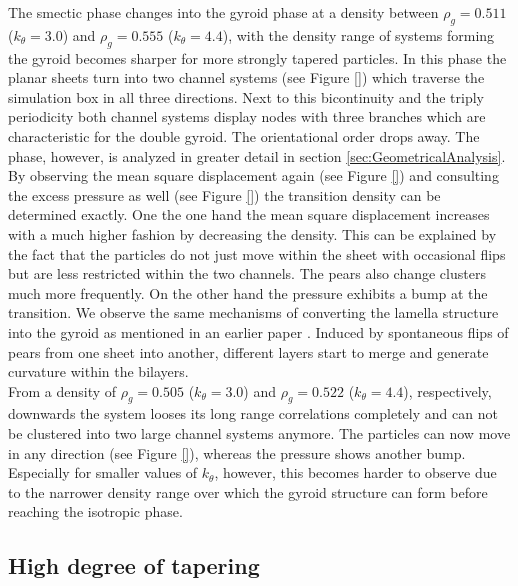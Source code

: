 \documentclass[epj,onecolumn]{webofc}
\begin{document}
The smectic phase changes into the gyroid phase at a density between $\rho_g=0.511$ ($k_{\theta}=3.0$) and $\rho_g=0.555$ ($k_{\theta}=4.4$), with the density range of systems forming the gyroid becomes sharper for more 
strongly tapered particles. In this phase the planar sheets turn into two channel systems (see Figure \ref{}) which traverse the simulation box in all three directions. Next to this bicontinuity and the triply periodicity both channel 
systems display nodes with three branches which are characteristic for the double gyroid. The orientational order drops away. The phase, however, is analyzed in greater detail in section \ref{sec:GeometricalAnalysis}. By 
observing the mean square displacement again (see Figure \ref{}) and consulting the excess pressure as well (see Figure \ref{}) the transition density can be determined exactly. One the one hand the mean square displacement 
increases with a much higher fashion by decreasing the density. This can be explained by the fact that the particles do not just move within the sheet with occasional flips but are less restricted within the two channels. The pears 
also change clusters much more frequently. On the other hand the pressure exhibits a bump at the transition. We observe the same mechanisms of converting the lamella structure into the gyroid as mentioned in an earlier paper 
\cite{}.  Induced by spontaneous flips of pears from one sheet into another, different layers start to merge and generate curvature within the bilayers.\\

From a density of $\rho_g=0.505$ ($k_{\theta}=3.0$) and $\rho_g=0.522$ ($k_{\theta}=4.4$), respectively,  downwards the system looses its long range correlations completely and can not be clustered into two large channel 
systems anymore. The particles can now move in any direction (see Figure \ref{}), whereas the pressure shows another bump. Especially for smaller values of $k_{\theta}$, however, this becomes harder to observe due to the 
narrower density range over which the gyroid structure can form before reaching the isotropic phase.

\subsection{High degree of tapering}
\label{sec:High_k_theta}
\end{document}
